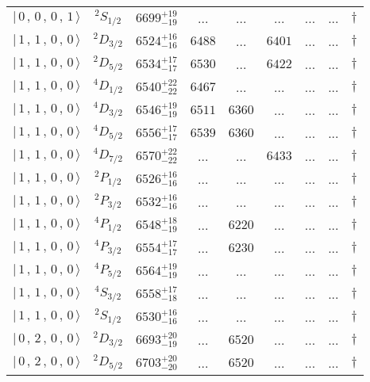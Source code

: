 \begin{tabular}{c c| c c c c c c c}
$\vert \,0\,,\,0\,,\,0\,,\,1 \,\rangle $ & $^{2}S_{1/2}$ & $6699^{+19}_{-19}$ & ... & ... & ... & ... & ... & $\dagger$ \\ 
$\vert \,1\,,\,1\,,\,0\,,\,0 \,\rangle $ & $^{2}D_{3/2}$ & $6524^{+16}_{-16}$ & $6488$ & ... & $6401$ & ... & ... & $\dagger$ \\ 
$\vert \,1\,,\,1\,,\,0\,,\,0 \,\rangle $ & $^{2}D_{5/2}$ & $6534^{+17}_{-17}$ & $6530$ & ... & $6422$ & ... & ... & $\dagger$ \\ 
$\vert \,1\,,\,1\,,\,0\,,\,0 \,\rangle $ & $^{4}D_{1/2}$ & $6540^{+22}_{-22}$ & $6467$ & ... & ... & ... & ... & $\dagger$ \\ 
$\vert \,1\,,\,1\,,\,0\,,\,0 \,\rangle $ & $^{4}D_{3/2}$ & $6546^{+19}_{-19}$ & $6511$ & $6360$ & ... & ... & ... & $\dagger$ \\ 
$\vert \,1\,,\,1\,,\,0\,,\,0 \,\rangle $ & $^{4}D_{5/2}$ & $6556^{+17}_{-17}$ & $6539$ & $6360$ & ... & ... & ... & $\dagger$ \\ 
$\vert \,1\,,\,1\,,\,0\,,\,0 \,\rangle $ & $^{4}D_{7/2}$ & $6570^{+22}_{-22}$ & ... & ... & $6433$ & ... & ... & $\dagger$ \\ 
$\vert \,1\,,\,1\,,\,0\,,\,0 \,\rangle $ & $^{2}P_{1/2}$ & $6526^{+16}_{-16}$ & ... & ... & ... & ... & ... & $\dagger$ \\ 
$\vert \,1\,,\,1\,,\,0\,,\,0 \,\rangle $ & $^{2}P_{3/2}$ & $6532^{+16}_{-16}$ & ... & ... & ... & ... & ... & $\dagger$ \\ 
$\vert \,1\,,\,1\,,\,0\,,\,0 \,\rangle $ & $^{4}P_{1/2}$ & $6548^{+18}_{-19}$ & ... & $6220$ & ... & ... & ... & $\dagger$ \\ 
$\vert \,1\,,\,1\,,\,0\,,\,0 \,\rangle $ & $^{4}P_{3/2}$ & $6554^{+17}_{-17}$ & ... & $6230$ & ... & ... & ... & $\dagger$ \\ 
$\vert \,1\,,\,1\,,\,0\,,\,0 \,\rangle $ & $^{4}P_{5/2}$ & $6564^{+19}_{-19}$ & ... & ... & ... & ... & ... & $\dagger$ \\ 
$\vert \,1\,,\,1\,,\,0\,,\,0 \,\rangle $ & $^{4}S_{3/2}$ & $6558^{+17}_{-18}$ & ... & ... & ... & ... & ... & $\dagger$ \\ 
$\vert \,1\,,\,1\,,\,0\,,\,0 \,\rangle $ & $^{2}S_{1/2}$ & $6530^{+16}_{-16}$ & ... & ... & ... & ... & ... & $\dagger$ \\ 
$\vert \,0\,,\,2\,,\,0\,,\,0 \,\rangle $ & $^{2}D_{3/2}$ & $6693^{+20}_{-19}$ & ... & $6520$ & ... & ... & ... & $\dagger$ \\ 
$\vert \,0\,,\,2\,,\,0\,,\,0 \,\rangle $ & $^{2}D_{5/2}$ & $6703^{+20}_{-20}$ & ... & $6520$ & ... & ... & ... & $\dagger$ \\ 
\hline \hline
\end{tabular}
